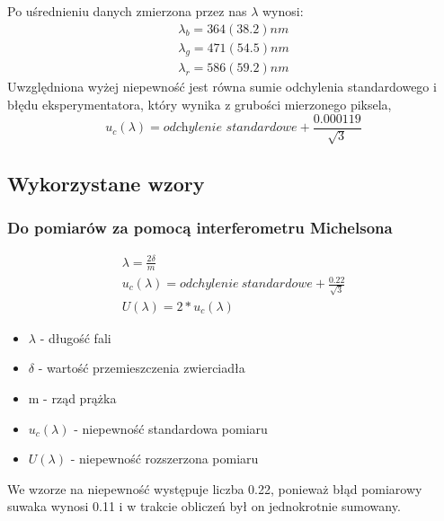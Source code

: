 \documentclass{article}
\begin{document}
\noindent Po uśrednieniu danych zmierzona przez nas $\lambda$ wynosi:
\begin{gather*}
    \lambda_b=364(38.2)nm \\
    \lambda_g=471(54.5)nm \\
    \lambda_r=586(59.2)nm
\end{gather*}
Uwzględniona wyżej niepewność jest równa sumie odchylenia standardowego i błędu eksperymentatora, który wynika z grubości mierzonego piksela, 
$$ u_{c}(\lambda) = \textit{odchylenie standardowe} + \frac{0.000119}{\sqrt{3}} $$

\subsection{Wykorzystane wzory}
\subsubsection{Do pomiarów za pomocą interferometru Michelsona}
\begin{gather*}
    \lambda = \frac{2\delta}{m} \\
    u_{c}(\lambda) = odchylenie\ standardowe + \frac{0.22}{\sqrt{3}} \\
    U(\lambda) = 2 * u_{c}(\lambda)
\end{gather*}
\begin{itemize}
    \item $\lambda$ - długość fali
    \item $\delta$ - wartość przemieszczenia zwierciadła
    \item m - rząd prążka
    \item $u_{c}(\lambda)$ - niepewność standardowa pomiaru
    \item $U(\lambda)$ - niepewność rozszerzona pomiaru
\end{itemize}
We wzorze na niepewność występuje liczba 0.22, ponieważ błąd pomiarowy suwaka wynosi 0.11 i w trakcie obliczeń był on jednokrotnie sumowany.
\end{document}
